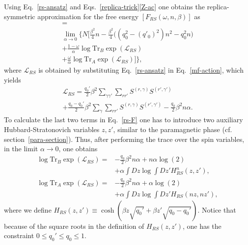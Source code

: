 \documentclass[twocolumn,superscriptaddress,prb,10pt]{revtex4-1}
\def\tr{\textrm{Tr}}
\begin{document}
Using Eq.~\eqref{rs-ansatz} and Eqs.~\eqref{replica-trick}\eqref{Z-ac} one obtains 
the replica-symmetric approximation for the free energy $[F_{RS}(\omega,n,\beta)]$ 
as 
%
\begin{multline}
[F_{RS}(\omega,n,\beta)]=\\\lim_{\alpha\to 0}\Big\{
N\Big[\frac{\beta^2}{4}n-\frac{\beta^2}{4}\Big(
(q_0^2-(q'_0)^2)n^2-q_0^2n\Big)\\
+\frac{1-\omega}{\alpha}\log\tr_B\exp({\mathcal L}_{RS})\\
+\frac{\omega}{\alpha}\log\tr_A \exp({\mathcal L}_{RS})
\Big]\Big\},
\label{rs-F}
\end{multline}
%
where ${\mathcal L}_{RS}$ is obtained by substituting Eq.~\eqref{rs-ansatz} 
in Eq.~\eqref{mf-action}, which yields 
%
\begin{multline}
\label{l-rs}
{\mathcal L}_{RS}=\frac{q_0'}{2}\beta^2
\sum\limits_{\gamma\gamma'}\sum_{rr'}
S^{(r,\gamma)}S^{(r',\gamma')}\\
+\frac{q_0-q_0'}{2}\beta^2\sum_\gamma\sum_{rr'}
S^{(r,\gamma)}S^{(r',\gamma')}-\frac{q_0}{2}\beta^2n\alpha.
\end{multline}
%
To calculate the last two terms in Eq.~\eqref{rs-F} one has to introduce 
two auxiliary Hubbard-Stratonovich variables $z,z'$, similar to the 
paramagnetic phase (cf. section~\ref{para-section}). Thus, after performing 
the trace over the spin variables, in the limit $\alpha\to0$, one obtains 
%
\begin{align}
\label{eq1}
 \log\tr_B\exp({\mathcal L}_{RS})=&
-\frac{q_0}{2}\beta^2 n\alpha+n\alpha\log(2)\\\nonumber
&+\alpha\int Dz
\log\int Dz'H_{RS}^n(z,z'),\\
\label{eq2}
 \log\tr_A\exp({\mathcal L}_{RS})=&
-\frac{q_0}{2}\beta^2 n\alpha+\alpha\log(2)\\\nonumber
&+\alpha\int Dz
\log\int Dz'H_{RS}(nz,nz'), 
\end{align}
%
where we define $H_{RS}(z,z')\equiv\cosh(\beta z\sqrt{q_0'}+\beta z'\sqrt{q_0-q_0'})$. 
Notice that because of the square roots in the definition of $H_{RS}(z,z')$, 
one has the constraint $0\le q_0'\le q_0\le 1$. 
\end{document}
